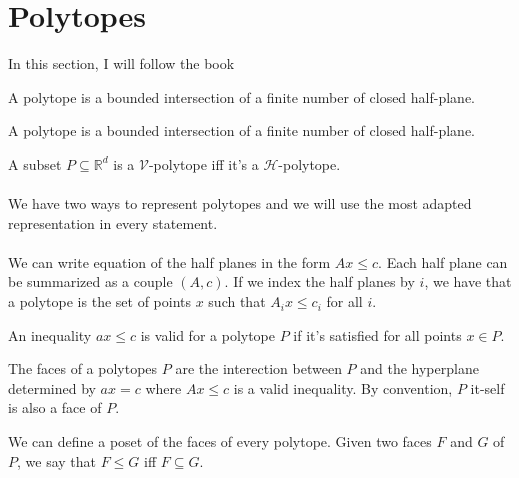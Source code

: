 \section{Polytopes}

In this section, I will follow the book \cite{polytopes}

\begin{definition}
  A polytope is a bounded intersection of a finite number of closed half-plane.
\end{definition}

\begin{definition}
  A polytope is a bounded intersection of a finite number of closed half-plane.
\end{definition}

\begin{theorem}
  A subset $P \subseteq \mathbb R^d$ is a $\mathcal V$-polytope iff it's a $\mathcal H$-polytope.
\end{theorem}

\paragraph{}
We have two ways to represent polytopes and we will use the most adapted representation in every statement.

\paragraph{}
We can write equation of the half planes in the form $Ax \le c$. Each half plane can be summarized as a couple $(A,c)$. If we index the half planes by $i$, we have that a polytope is the set of points $x$ such that $A_i x \le c_i$ for all $i$.

\begin{definition}
  An inequality $ax \le c$ is valid for a polytope $P$ if it's satisfied for all points $x \in P$.
\end{definition}

\begin{definition}
  The faces of a polytopes $P$ are the interection between $P$ and the hyperplane determined by $ax = c$ where $Ax \le c$ is a valid inequality. By convention, $P$ it-self is also a face of $P$.
\end{definition}

\begin{definition}
  We can define a poset of the faces of every polytope. Given two faces $F$ and $G$ of $P$, we say that $F \le G$ iff $F \subseteq G$.
\end{definition}

